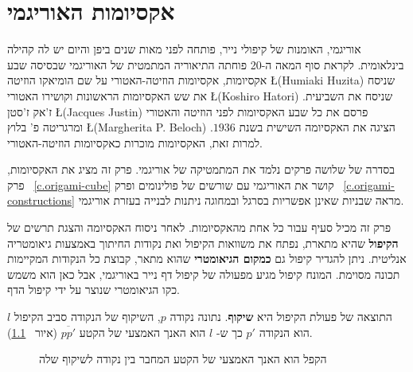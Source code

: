 


\chapter{אקסיומות האוריגמי}\label{c.origami-axioms}

אוריגמי, האומנות של קיפולי נייר, פותחה לפני מאות שנים ביפן והיום יש לה קהילה בינלאומית. לקראת סוף המאה ה-20 פוחתה התיאוריה המתמטית של האוריגמי שבסיסה שבע אקסיומות, אקסיומות הוזיטה-האטורי
על שם הומיאקו הוזיטה
\L{(Humiaki Huzita)}
שניסח את שש האקסיומות הראשונות וקושירו האטורי
\L{(Koshiro Hatori)}
שניסח את השביעית. ז'אק ז'סטן
\L{(Jacques Justin)}
פרסם את כל שבע האקסיומות לפני הוזיטה והאטורי
ומרגריטה פ' בלוץ
\L{(Margherita P. Beloch)}
הציגה את האקסיומה השישית בשנת
$1936$.
למרות זאת, האקסיומות מוכרות כאקסיומות הוזיטה-האטורי.

בסדרה של שלושה פרקים נלמד את המתמטיקה של אוריגמי. פרק זה מציג את האקסיומות, פרק%
~\ref{c.origami-cube}
קושר את האוריגמי עם שורשים של פולינומים ופרק%
~\ref{c.origami-constructions} 
מראה שבניות שאינן אפשריות בסרגל ובמחוגה ניתנות לבנייה בעזרת אוריגמי.
 
פרק זה מכיל סעיף עבור כל אחת מהאקסיומות. לאחר ניסוח האקסיומה והצגת תרשים של 
\textbf{הקיפול}
שהיא מתארת, נפתח את משוואות הקיפול ואת נקודות החיתוך באמצעות גיאומטריה אנליטית. ניתן להגדיר קיפול גם 
\textbf{כמקום הגיאומטרי}
שהוא מתאר, קבוצת כל הנקודות המקיימות תכונה מסוימת. המונח קיפול מגיע מפעולה של קיפול דף נייר באוריגמי, אבל כאן הוא משמש כקו הגיאומטרי שנוצר על ידי קיפול הדף.

התוצאה של פעולת הקיפול היא
\textbf{שיקוף}.
נתונה נקודה
$p$,
השיקוף של הנקודה סביב הקיפול
$l$
הוא הנקודה 
$p'$
כך ש-%
$l$
הוא האנך האמצעי של הקטע
$\overline{pp'}$
(איור%
~\ref{f.origami-def}).
\begin{figure}[tb]
\begin{center}
\end{center}
\caption{הקפל הוא האנך האמצעי של הקטע המחבר בין נקודה לשיקוף שלה}
\label{f.origami-def}
\end{figure}

